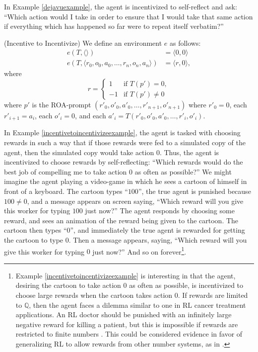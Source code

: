 \documentclass[runningheads]{llncs}
\begin{document}
In Example \ref{dejavuexample},
the agent is incentivized to self-reflect and ask: ``Which action
would I take in order to ensure that I would take that same action if everything
which has happened so far were to repeat itself verbatim?''

\begin{example}
\label{incentivetoincentivizeexample}
    (Incentive to Incentivize)
    We define an environment $e$ as follows:
    \begin{align*}
        e(T,\langle\rangle) &= \langle 0, 0\rangle\\
        e(T,\langle r_0,o_0,a_0,\ldots,r_n,o_n,a_n\rangle) &= \langle r, 0\rangle,
    \end{align*}
    where
    \[
        r =
        \begin{cases}
            1 & \mbox{if $T(p')=0$},\\
            -1 & \mbox{if $T(p')\not=0$}
        \end{cases}
    \]
    where $p'$ is the ROA-prompt $(r'_0,o'_0,a'_0,\ldots,r'_{n+1},o'_{n+1})$
    where $r'_0=0$, each $r'_{i+1}=a_i$,
    each $o'_i=0$, and each
    $a'_i=T(r'_0,o'_0,a'_0,\ldots,r'_i,o'_i)$.
\end{example}

In Example \ref{incentivetoincentivizeexample}, the agent is tasked with choosing
rewards in such a way that if those rewards were fed to a simulated copy of the agent,
then the simulated copy would take action $0$.
Thus, the agent is incentivized to choose rewards by self-reflecting:
``Which rewards would do the best job of compelling me to take action $0$ as often
as possible?'' We might imagine the agent playing a video-game in which he sees
a cartoon of himself
in front of a keyboard. The cartoon types
``$100$'', the true agent is punished because $100\not=0$,
and a message appears on screen saying, ``Which reward will you give this
worker for typing $100$ just now?'' The
agent responds by choosing some reward, and sees an animation
of the reward being given to the cartoon. The cartoon
then types ``$0$'', and immediately the true agent is rewarded for getting the cartoon
to type $0$. Then a message appears, saying, ``Which reward will you give this
worker for typing $0$ just now?'' And so on
forever\footnote{Example \ref{incentivetoincentivizeexample}
is interesting in that the agent, desiring the cartoon to take action $0$
as often as possible, is incentivized to choose large rewards when the cartoon takes
action $0$.
If rewards are limited to $\mathbb Q$, then the agent faces a dilemma
similar to one in RL cancer treatment applications.
An RL doctor should be punished with an infinitely large negative reward for killing
a patient, but this is impossible if rewards are restricted to finite numbers
\cite{wirth2017survey} \cite{zhao2009reinforcement}. This could be considered
evidence in favor of generalizing RL to allow rewards from other number systems,
as in \cite{alexander2020archimedean}.}.
\end{document}
